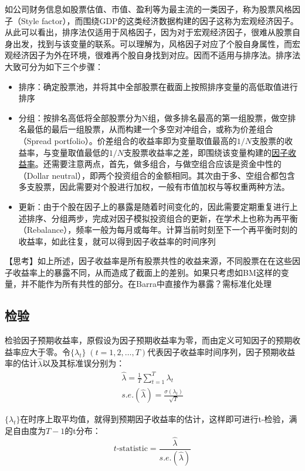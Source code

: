 \documentclass[11pt]{article}
\begin{document}
如公司财务信息如股票估值、市值、盈利等为最主流的一类因子，称为股票风格因子（Style factor），而围绕GDP的这类经济数据构建的因子这称为宏观经济因子。从此可以看出，排序法仅适用于风格因子，因为对于宏观经济因子，很难从股票自身出发，找到与该变量的联系。可以理解为，风格因子对应了个股自身属性，而宏观经济因子为外在环境，很难再个股自身找到对应。因而不适用与排序法。排序法大致可分为如下三个步骤：
\begin{itemize}
    \item 排序：确定股票池，并将其中全部股票在截面上按照排序变量的高低取值进行排序
    \item 分组：按排名高低将全部股票分为N组，做多排名最高的第一组股票，做空排名最低的最后一组股票，从而构建一个多空对冲组合，或称为价差组合（Spread portfolio）。价差组合的收益率即为变量取值最高的$1/N$支股票的收益率，与变量取值最低的$1/N$支股票收益率之差，即围绕该变量构建的\uline{因子收益率}。还需要注意两点，首先，做多组合，与做空组合应该是资金中性的（Dollar neutral），即两个投资组合的金额相同。其次由于多、空组合都包含多支股票，因此需要对个股进行加权，一般有市值加权与等权重两种方法。
    \item 更新：由于个股在因子上的暴露是随着时间变化的，因此需要定期重复进行上述排序、分组两步，完成对因子模拟投资组合的更新，在学术上也称为再平衡（Rebalance），频率一般为每月或每年。计算当前时刻至下一个再平衡时刻的收益率，如此往复，就可以得到因子收益率的时间序列
\end{itemize}

【思考】如上所述，因子收益率是所有股票共性的收益来源，不同股票在在这些因子收益率上的暴露不同，从而造成了截面上的差别。如果只考虑如BM这样的变量，并不能作为所有共性的部分。在Barra中直接作为暴露？需标准化处理

\subsection{检验}

检验因子预期收益率，原假设为因子预期收益率为零，而由定义可知因子的预期收益率应大于零。令$\{\lambda_t\} \; (t=1,2,\dots,T)$代表因子收益率时间序列，因子预期收益率的估计$\hat{\lambda}$以及其标准误分别为：
\begin{gather*}
    \hat{\lambda} = \frac{1}{T}\sum_{t=1}^{T} \lambda_t \\
    s.e.(\hat{\lambda}) = \frac{\sigma(\lambda_t)}{\sqrt{T}}
\end{gather*}

$\{\lambda_t\}$在时序上取平均值，就得到预期因子收益率的估计，这样即可进行t-检验，满足自由度为$T-1$的t分布：
\begin{equation*}
    t\text{-statistic} = \frac{\hat{\lambda}}{s.e.(\hat{\lambda})}
\end{equation*}
\end{document}
